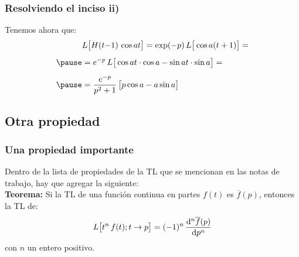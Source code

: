 \documentclass[12pt]{beamer}
\begin{document}
\begin{frame}
\frametitle{Resolviendo el inciso ii)}
Tenemos ahora que:
\pause
\begin{eqnarray*}
\begin{aligned}
&L \big[ H(t {-} 1) \, \cos a t \big] = \exp(- p) \, L \big[ \cos a (t + 1) \big] = \\[0.5em] \pause
&= e^{-p} \, L \big[ \cos a t \cdot \cos a - \sin a t \cdot \sin a \big] = \\[0.5em] \pause
&= \dfrac{e^{-p}}{p^{2} + 1} \, \big[ p \cos a - a \sin a \big]
\end{aligned}
\end{eqnarray*}
\end{frame}

\subsection{Otra propiedad}

\begin{frame}
\frametitle{Una propiedad importante}
Dentro de la lista de propiedades de la TL que se mencionan en las notas de trabajo, hay que agregar la siguiente:
\\
\bigskip
\pause
\noindent \textbf{Teorema: } Si la TL de una función continua en partes $f(t)$ es $\overline{f}(p)$, entonces la TL de:
\pause
\begin{align*}
L \big[ t^{n} \, f(t); t \to p \big] = (-1)^{n} \, \dv[n]{\overline{f}(p)}{p}
\end{align*}
con $n$ un entero positivo.
\end{frame}
\end{document}
